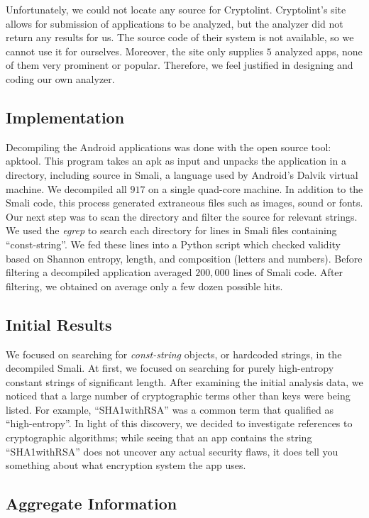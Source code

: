 \documentclass[11pt]{article}
\numberwithin{theorem}{subsection}
\begin{document}
Unfortunately, we could not locate any source for Cryptolint. Cryptolint's site allows for submission of
applications to be analyzed, but the analyzer did not return any results for us.  The source code of their
system is not available, so we cannot use it for ourselves.   Moreover, the site only supplies $5$ analyzed apps, 
none of them very prominent or popular. Therefore, we feel justified in designing and coding our own analyzer.

\subsection{Implementation}

  Decompiling the Android applications was done with the open source tool: apktool. This program takes
an apk as input and unpacks the application in a directory, including source in Smali, 
a language used by Android's Dalvik virtual machine.
We decompiled all $917$ on a single quad-core machine. In addition to the Smali code, this process generated extraneous files
such as images, sound or fonts. 
  Our next step was to scan the directory and filter the source for relevant strings. We used the \textit{egrep} to search
each directory for lines in Smali files containing ``const-string''. We fed these lines into a Python script
which checked validity based on Shannon entropy, length, and composition (letters and numbers). Before filtering a
decompiled application averaged $200,000$ lines of Smali code. After filtering, we obtained on average only a few dozen
possible hits.
\subsection{Initial Results}

  We focused on searching for \textit{const-string} objects, or hardcoded strings, in the decompiled Smali.
At first, we focused on searching for purely high-entropy constant strings of significant length. 
After examining the initial analysis data, we noticed that a large number of cryptographic terms other than keys were being
listed. For example, ``SHA1withRSA'' was a common term that qualified as ``high-entropy''. In light of this discovery,
we decided to investigate references to cryptographic algorithms; while seeing that an app contains the string ``SHA1withRSA''
does not uncover any actual security flaws, it does tell you something about what encryption system the app uses.

\subsection{Aggregate Information}
\end{document}
